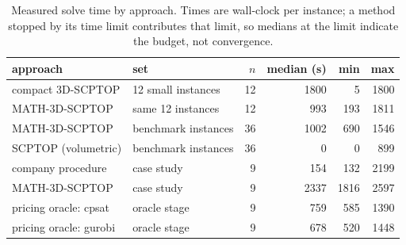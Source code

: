 \begin{table}[!htbp]
\centering
\small
\caption{Measured solve time by approach. Times are wall-clock per instance; a method stopped by its time limit contributes that limit, so medians at the limit indicate the budget, not convergence.}
\label{tab:times-summary}
\begin{tabular}{llrrrr}
\toprule
approach & set & $n$ & median (s) & min & max \\
\midrule
compact 3D-SCPTOP & 12 small instances & 12 & 1800 & 5 & 1800 \\
MATH-3D-SCPTOP & same 12 instances & 12 & 993 & 193 & 1811 \\
MATH-3D-SCPTOP & benchmark instances & 36 & 1002 & 690 & 1546 \\
SCPTOP (volumetric) & benchmark instances & 36 & 0 & 0 & 899 \\
company procedure & case study & 9 & 154 & 132 & 2199 \\
MATH-3D-SCPTOP & case study & 9 & 2337 & 1816 & 2597 \\
pricing oracle: cpsat & oracle stage & 9 & 759 & 585 & 1390 \\
pricing oracle: gurobi & oracle stage & 9 & 678 & 520 & 1448 \\
\bottomrule
\end{tabular}
\end{table}
